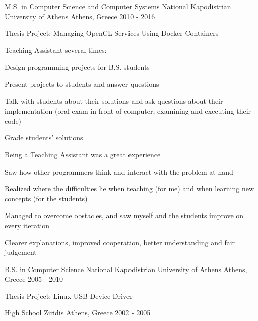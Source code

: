
\begin{cventries}

  \cventry
    {M.S. in Computer Science and Computer Systems} %
    {National Kapodistrian University of Athens} %
    {Athens, Greece} %
    {2010 - 2016} %
    {
      \begin{cvitems} %
        \item {Thesis Project: Managing OpenCL Services Using Docker Containers}
		\item {Teaching Assistant several times:}
		\item {Design programming projects for B.S. students}
		\item {Present projects to students and answer questions}
		\item {Talk with students about their solutions and ask questions about their implementation (oral exam in front of computer, examining and executing their code)}
		\item {Grade students' solutions}
		\item {Being a Teaching Assistant was a great experience}
		\item {Saw how other programmers think and interact with the problem at hand}
		\item {Realized where the difficulties lie when teaching (for me) and when learning new concepts (for the students)}
		\item {Managed to overcome obstacles, and saw myself and the students improve on every iteration}
		\item {Clearer explanations, improved cooperation, better understanding and fair judgement}
      \end{cvitems}
    }

  \cventry
    {B.S. in Computer Science} %
    {National Kapodistrian University of Athens} %
    {Athens, Greece} %
    {2005 - 2010} %
    {
      \begin{cvitems} %
        \item {Thesis Project: Linux USB Device Driver}
      \end{cvitems}
    }

  \cventry
    {High School} %
    {Ziridis} %
    {Athens, Greece} %
    {2002 - 2005} %
	{}

\end{cventries}
